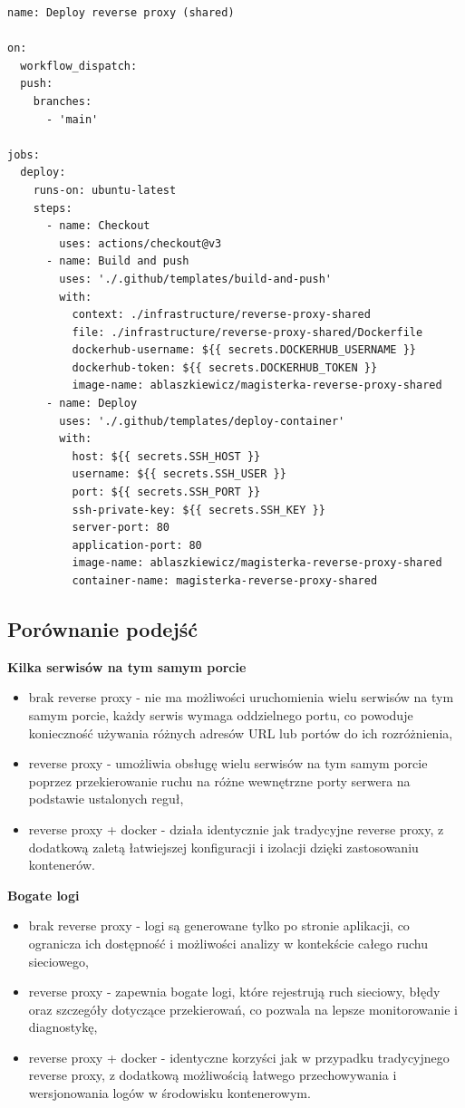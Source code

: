 \documentclass{article}
\begin{document}
\begin{lstlisting}[caption=Plik \texttt{.github/workflows/shared-deploy-reverse-proxy.yml}]
name: Deploy reverse proxy (shared)

on:
  workflow_dispatch:
  push:
    branches:
      - 'main'

jobs:
  deploy:
    runs-on: ubuntu-latest
    steps:
      - name: Checkout
        uses: actions/checkout@v3
      - name: Build and push
        uses: './.github/templates/build-and-push'
        with:
          context: ./infrastructure/reverse-proxy-shared
          file: ./infrastructure/reverse-proxy-shared/Dockerfile
          dockerhub-username: ${{ secrets.DOCKERHUB_USERNAME }}
          dockerhub-token: ${{ secrets.DOCKERHUB_TOKEN }}
          image-name: ablaszkiewicz/magisterka-reverse-proxy-shared
      - name: Deploy
        uses: './.github/templates/deploy-container'
        with:
          host: ${{ secrets.SSH_HOST }}
          username: ${{ secrets.SSH_USER }}
          port: ${{ secrets.SSH_PORT }}
          ssh-private-key: ${{ secrets.SSH_KEY }}
          server-port: 80
          application-port: 80
          image-name: ablaszkiewicz/magisterka-reverse-proxy-shared
          container-name: magisterka-reverse-proxy-shared

\end{lstlisting}

\subsection{Porównanie podejść}

\textbf{Kilka serwisów na tym samym porcie}
\begin{itemize}
    \item brak reverse proxy - nie ma możliwości uruchomienia wielu serwisów na tym samym porcie, każdy serwis wymaga oddzielnego portu, co powoduje konieczność używania różnych adresów URL lub portów do ich rozróżnienia,
    \item reverse proxy - umożliwia obsługę wielu serwisów na tym samym porcie poprzez przekierowanie ruchu na różne wewnętrzne porty serwera na podstawie ustalonych reguł,
    \item reverse proxy + docker - działa identycznie jak tradycyjne reverse proxy, z dodatkową zaletą łatwiejszej konfiguracji i izolacji dzięki zastosowaniu kontenerów.
\end{itemize}

\textbf{Bogate logi}
\begin{itemize}
    \item brak reverse proxy - logi są generowane tylko po stronie aplikacji, co ogranicza ich dostępność i możliwości analizy w kontekście całego ruchu sieciowego,
    \item reverse proxy - zapewnia bogate logi, które rejestrują ruch sieciowy, błędy oraz szczegóły dotyczące przekierowań, co pozwala na lepsze monitorowanie i diagnostykę,
    \item reverse proxy + docker - identyczne korzyści jak w przypadku tradycyjnego reverse proxy, z dodatkową możliwością łatwego przechowywania i wersjonowania logów w środowisku kontenerowym.
\end{itemize}
\end{document}
